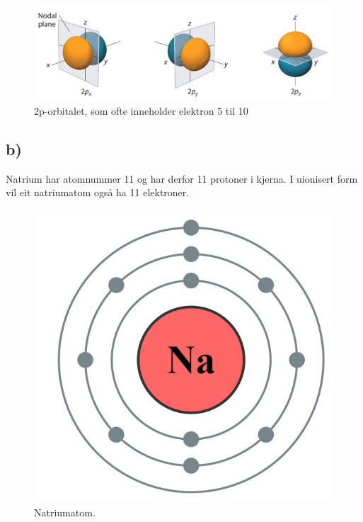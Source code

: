\documentclass[12pt,a4paper]{article}
\begin{document}
    \begin{figure}[!htb]
      \begin{center}
        \includegraphics[scale=.08]{kj_01_orbital}
        \caption{2p-orbitalet, som ofte inneholder elektron 5 til 10}
      \end{center}
    \end{figure}

    \newpage


    \subsection*{b)}
    Natrium har atomnummer 11 og har derfor 11 protoner i kjerna. I uionisert form vil eit
    natriumatom også ha 11 elektroner.
    \begin{figure}[!h]
      \begin{center}
        \includegraphics[scale=.08]{kj_01_bohr_na}
        \caption{Natriumatom.}
      \end{center}
    \end{figure}
\end{document}
